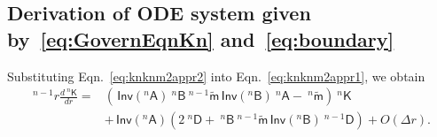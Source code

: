\documentclass[preprint,10pt,times]{elsarticle}
\numberwithin{equation}{section}
\renewcommand{\u}[1]{\boldsymbol{#1}}
\newcommand{\usf}[1]{\u{\mathsf #1}}
\newcommand{\pr}[1]{\left( #1 \right)}
\newcommand{\Inv}{\,\mathsf{Inv}}
\renewcommand{\>}{$\Rightarrow$}
\begin{document}
\subsection{Derivation of ODE system given by~\eqref{eq:GovernEqnKn} and~\eqref{eq:boundary}}
\label{Appen:GovernEqnKn}

Substituting Eqn.~\eqref{eq:knknm2appr2} into Eqn.~\eqref{eq:knknm2appr1}, we obtain
\begin{equation}
	\begin{aligned}
		~^{n-1}\!{r} \frac{d ~^{n}{\usf{K}}}{dr} = & \left( \Inv\pr{{}^{n}\usf{A}} ~^{n}{\usf{B}} ~^{n-1}\tilde{\usf{m}} \Inv\pr{{}^{n}\usf{B}} ~^{n}{\usf{A}} - ~^{n}\tilde{\usf{m}} \right) ~^{n}{\usf{K}} \\
		& + \Inv\pr{{}^{n}\usf{A}} \left( 2~^{n}{\usf{D}} + ~^{n}{\usf{B}} ~^{n-1}\tilde{\usf{m}} \Inv\pr{{}^{n}\usf{B}} ~^{{n-1}}{\usf{D}} \right) + O(\Delta r).
	\end{aligned}
	\label{eq:AppendKndr1}
\end{equation}
\end{document}
